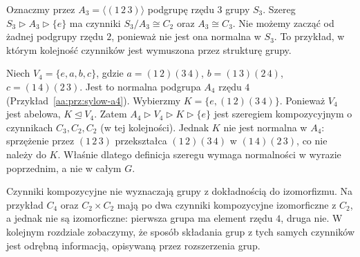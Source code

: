 \begin{przyklad}
\label{aa:prz:jordan-s3}
Oznaczmy przez $A_3=\langle(1\,2\,3)\rangle$ podgrupę
rzędu $3$ grupy $S_3$. Szereg
$S_3\triangleright A_3\triangleright\{e\}$
ma czynniki $S_3/A_3\cong C_2$ oraz $A_3\cong C_3$.
Nie możemy zacząć od żadnej podgrupy rzędu $2$,
ponieważ nie jest ona normalna w $S_3$.
To przykład, w którym kolejność czynników jest wymuszona przez strukturę grupy.
\end{przyklad}

\begin{przyklad}
\label{aa:prz:jordan-a4}
Niech $V_4=\{e,a,b,c\}$, gdzie
$a=(1\,2)(3\,4)$, $b=(1\,3)(2\,4)$,
$c=(1\,4)(2\,3)$.
Jest to normalna podgrupa $A_4$ rzędu $4$
(Przykład~\ref{aa:prz:sylow-a4}).
Wybierzmy $K=\{e,(1\,2)(3\,4)\}$.
Ponieważ $V_4$ jest abelowa, $K\trianglelefteq V_4$.
Zatem
$A_4\triangleright V_4\triangleright K\triangleright\{e\}$
jest szeregiem kompozycyjnym o czynnikach
$C_3,C_2,C_2$ (w tej kolejności).
Jednak $K$ nie jest normalna w $A_4$: sprzężenie
przez $(1\,2\,3)$ przekształca $(1\,2)(3\,4)$
w $(1\,4)(2\,3)$, co nie należy do $K$.
Właśnie dlatego definicja szeregu wymaga normalności
w wyrazie poprzednim, a nie w całym $G$.
\end{przyklad}

\begin{uwaga}
Czynniki kompozycyjne nie wyznaczają grupy z dokładnością do
izomorfizmu. Na przykład $C_4$ oraz $C_2\times C_2$
mają po dwa czynniki kompozycyjne izomorficzne z $C_2$,
a jednak nie są izomorficzne: pierwsza grupa ma element
rzędu $4$, druga nie. W kolejnym rozdziale zobaczymy,
że sposób składania grup z tych samych czynników jest
odrębną informacją, opisywaną przez rozszerzenia grup.
\end{uwaga}

